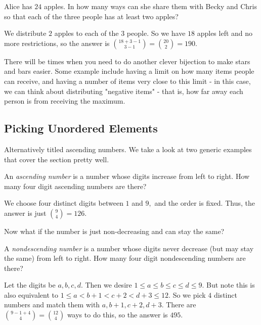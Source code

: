 \documentclass[blue,onecol]{shooting}
\begin{document}
\begin{exam}[AMC 8 2019/25]
Alice has $24$ apples. In how many ways can she share them with Becky and Chris so that each of the three people has at least two apples?
\end{exam}

\begin{sol}
We distribute $2$ apples to each of the $3$ people. So we have $18$ apples left and no more restrictions, so the answer is $\binom{18+3-1}{3-1}=\binom{20}{2}=190.$
\end{sol}

There will be times when you need to do another clever bijection to make stars and bars easier. Some example include having a limit on how many items people can receive, and having a number of items very close to this limit - in this case, we can think about distributing "negative items" - that is, how far away each person is from receiving the maximum.

\subsection{Picking Unordered Elements}
Alternatively titled ascending numbers. We take a look at two generic examples that cover the section pretty well.

\begin{exam}
An \textit{ascending number} is a number whose digits increase from left to right. How many four digit ascending numbers are there?
\end{exam}

\begin{sol}
We choose four distinct digits between $1$ and $9,$ and the order is fixed. Thus, the answer is just $\binom{9}{4}=126.$
\end{sol}

Now what if the number is just non-decreasing and can stay the same?

\begin{exam}
A \textit{nondescending number} is a number whose digits never decrease (but may stay the same) from left to right. How many four digit nondescending numbers are there?
\end{exam}

\begin{sol}
Let the digits be $a,b,c,d.$ Then we desire $1\leq a\leq b\leq c\leq d\leq 9.$ But note this is also equivalent to $1\leq a<b+1<c+2<d+3\leq 12.$ So we pick $4$ distinct numbers and match them with $a,b+1,c+2,d+3.$ There are $\binom{9-1+4}{4}=\binom{12}{4}$ ways to do this, so the answer is $495.$
\end{sol}
\end{document}

